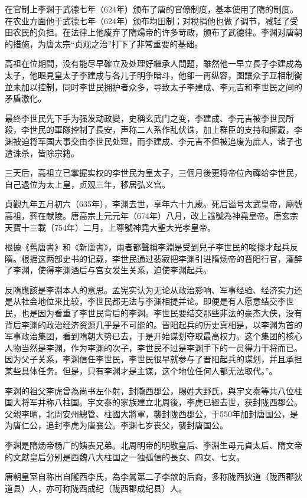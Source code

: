 在官制上李渊于武德七年（624年）颁布了唐的官僚制度，基本使用了隋的制度。在农业方面他于武德七年（624年）颁布均田制；对稅捐他也做了调节，减轻了受田农民的负担。在法律上他废弃了隋煬帝的许多苛政，颁布了武德律。李渊对唐朝的措施，为唐太宗“贞观之治”打下了非常重要的基础。

高祖在位期間，没有能尽早確立及处理好繼承人問題，雖然他一早立長子李建成為太子，他眼見皇太子李建成与各儿子明争暗斗，他卻一再纵容，图讓众子互相制衡並未加以控制，同时李世民拥护者众多，导致太子李建成、李元吉和李世民之间的矛盾激化。

最终李世民先下手为强发动政變，史稱玄武门之变，李建成、李元吉被李世民所殺，李世民的軍隊控制了長安，声称二人系作乱伏诛，加上群臣的支持和擁戴，李渊被迫将军国大事交由李世民处理，而李建成、李元吉不但被追废为庶人，诸子也遭诛杀，皆除宗籍。

三天后，高祖立已掌握实权的李世民为皇太子，三個月後更将帝位內禪给李世民，自己退位为太上皇，贞观三年，移居弘义宫。

貞觀九年五月初六（635年），李渊去世，享年六十九歲。死后谥号太武皇帝，廟號高祖，葬在献陵。唐高宗上元元年（674年）八月，改上諡號為神堯皇帝。唐玄宗天寶十三載（754年）二月，上尊號神堯大聖大光孝皇帝。

根據《舊唐書》和《新唐書》，兩者都聲稱李淵是受到兒子李世民的唆擺才起兵反隋。根据这两部史书的记载，李世民通过裴寂把李渊引进隋炀帝的晋阳行官，灌醉了李渊，使得李渊酒后与宫女发生关系，迫使李渊起兵。

反隋應該是李淵本人的意思。孟宪实认为无论从政治影响、军事经验、经济实力还是从社会地位来比较，李世民都无法与李渊相提并论。即便是有人愿意结交李世民，也是因为看重了李世民背后的李渊。李世民要结交那些非法的豪杰大侠，没有背后李渊的政治经济资源几乎是不可能的。晋阳起兵的历史真相是，以李渊为首的军事政治集团，看到隋朝大势已去，于是开始谋划夺取最高权力。这个集团的核心人物当然是李渊，作为李渊的次子，李世民不过是李渊手下的一员得力干将而已。因为父子关系，李渊信任李世民，李世民很早就参与了晋阳起兵的谋划，并且承担某些具体任务。但是，只有李渊才是主谋，这个地位任何人都无法取代。”。

李渊的祖父李虎曾為尚书左仆射，封隴西郡公，賜姓大野氏，與宇文泰等共八位柱国大将军并称八柱国。宇文泰的家族建立北周後，李虎已經去世，获封陇西郡公。父親李昞，北周安州總管、柱國大將軍，襲封陇西郡公，于550年加封唐国公，是为唐仁公，追封李虎为唐襄公。李渊七岁丧父，襲封唐国公。

李渊是隋炀帝杨广的姨表兄弟。北周明帝的明敬皇后、李淵生母元貞太后、隋文帝的文獻皇后分别是西魏八大柱国之一独孤信的長女、四女、七女。

唐朝皇室自称出自隴西李氏，為李暠第二子李歆的后裔，多称陇西狄道（陇西郡狄道县）人，亦可称陇西成纪（陇西郡成纪县）人。

